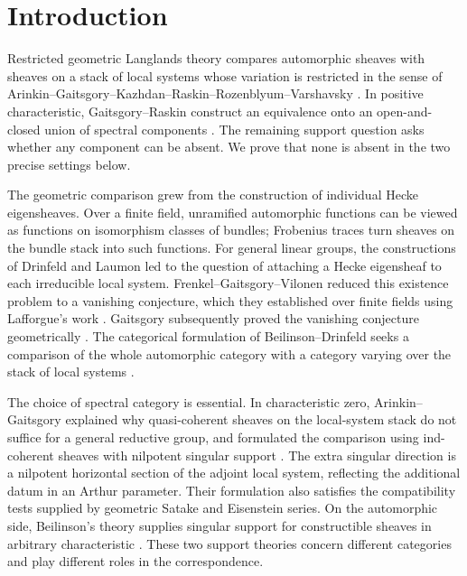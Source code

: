 \section{Introduction}\label{sec:introduction}

Restricted geometric Langlands theory compares automorphic sheaves with
sheaves on a stack of local systems whose variation is restricted in the
sense of Arinkin--Gaitsgory--Kazhdan--Raskin--Rozenblyum--Varshavsky
\cite{AGKRRV}. In positive characteristic, Gaitsgory--Raskin construct an
equivalence onto an open-and-closed union of spectral components
\cite[Main Theorem~1.3.9(i)]{GR}. The remaining support question asks whether
any component can be absent. We prove that none is absent in the two
precise settings below.

The geometric comparison grew from the construction of individual Hecke
eigensheaves. Over a finite field, unramified automorphic functions can be
viewed as functions on isomorphism classes of bundles; Frobenius traces
turn sheaves on the bundle stack into such functions. For general linear
groups, the constructions of Drinfeld and Laumon led to the question of
attaching a Hecke eigensheaf to each irreducible local system.
Frenkel--Gaitsgory--Vilonen reduced this existence problem to a vanishing
conjecture, which they established over finite fields using Lafforgue's
work \cite[\S0.1 and \S\S1--2]{FrenkelGaitsgoryVilonen}.
Gaitsgory subsequently proved the vanishing conjecture geometrically
\cite[\S0.1 and \S2]{GaitsgoryVanishing}.
The categorical formulation of Beilinson--Drinfeld seeks a comparison
of the whole automorphic category with a category varying over the stack
of local systems \cite[\S0.1]{AGKRRV}.

The choice of spectral category is essential. In characteristic zero,
Arinkin--Gaitsgory explained why quasi-coherent sheaves on the local-system
stack do not suffice for a general reductive group, and formulated the
comparison using ind-coherent sheaves with nilpotent singular support
\cite[\S\S1.1.1--1.1.6]{ArinkinGaitsgory}.
The extra singular direction is a nilpotent horizontal section of the
adjoint local system, reflecting the additional datum in an Arthur parameter.
Their formulation also satisfies the compatibility tests supplied by
geometric Satake and Eisenstein series. On the automorphic side,
Beilinson's theory supplies singular support for constructible sheaves
in arbitrary characteristic \cite[\S1.3]{BeilinsonSingularSupport}.
These two support theories concern different categories and play
different roles in the correspondence.

